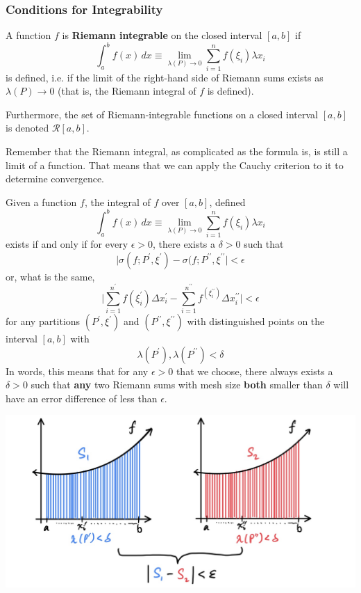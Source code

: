 \documentclass{article}
\begin{document}
      \subsubsection{Conditions for Integrability}

      \begin{definition}
        A function $f$ is \textbf{Riemann integrable} on the closed interval $[a, b]$ if 
        \[\int_a^b f(x)\,dx \equiv \lim_{\lambda(P) \rightarrow 0} \sum_{i=1}^n f(\xi_i) \lambda x_i\]
        is defined, i.e. if the limit of the right-hand side of Riemann sums exists as $\lambda(P) \rightarrow 0$ (that is, the Riemann integral of $f$ is defined). 

        Furthermore, the set of Riemann-integrable functions on a closed interval $[a, b]$ is denoted $\mathcal{R}[a,b]$. 
      \end{definition}

      Remember that the Riemann integral, as complicated as the formula is, is still a limit of a function. That means that we can apply the Cauchy criterion to it to determine convergence. 

      \begin{lemma}
        Given a function $f$, the integral of $f$ over $[a, b]$, defined
        \[\int_a^b f(x)\,dx \equiv \lim_{\lambda(P) \rightarrow 0} \sum_{i=1}^n f(\xi_i) \lambda x_i\]
        exists if and only if for every $\epsilon>0$, there exists a $\delta>0$ such that 
        \[\big| \sigma(f; P^\prime, \xi^\prime) - \sigma(f; P^{\prime\prime}, \xi^{\prime\prime} \big| < \epsilon\]
        or, what is the same, 
        \[\Bigg| \sum_{i=1}^{n^\prime} f(\xi_i^\prime) \Delta x_i^\prime - \sum_{i=1}^{n^{\prime\prime}} f^(\xi_i^{\prime\prime}) \Delta x_i^{\prime\prime} \Bigg| < \epsilon\]
        for any partitions $(P^\prime, \xi^\prime)$ and $(P^{\prime\prime}, \xi^{\prime\prime})$ with distinguished points on the interval $[a, b]$ with
        \[\lambda(P^\prime), \lambda(P^{\prime\prime}) < \delta\]
        In words, this means that for any $\epsilon>0$ that we choose, there always exists a $\delta>0$ such that \textbf{any} two Riemann sums with mesh size \textbf{both} smaller than $\delta$ will have an error difference of less than $\epsilon$. \begin{center}
            \includegraphics[scale=0.25]{img/Cauchy_Criterion_of_Riemann_Integral.jpg}
        \end{center}
      \end{lemma}
\end{document}
